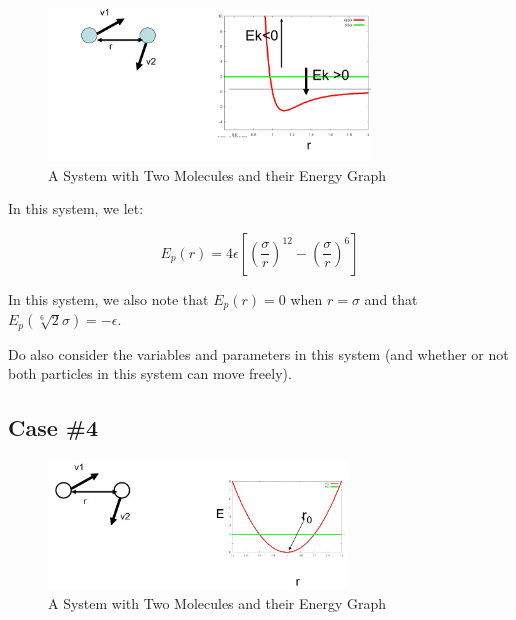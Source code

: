 \documentclass[
  letterpaper,
  DIV=11,
  numbers=noendperiod]{scrreprt}
\begin{document}
\begin{figure}

{\centering \includegraphics[width=3.36in,height=\textheight]{./images/wk1/sys3.jpg}

}

\caption{A System with Two Molecules and their Energy Graph}

\end{figure}

In this system, we let:

\begin{equation}
  E_p(r) = 4\epsilon\left[\left(\frac{\sigma}{r}\right)^{12} - \left(\frac{\sigma}{r}\right)^6\right]
\end{equation}

In this system, we also note that \(E_p(r) = 0\) when \(r = \sigma\) and
that \(\displaystyle E_p(\sqrt[6]{2}\sigma) = -\epsilon\).

Do also consider the variables and parameters in this system (and
whether or not both particles in this system can move freely).

\hypertarget{case-4-1}{%
\subsection{Case \#4}\label{case-4-1}}

\begin{figure}

{\centering \includegraphics[width=3.13in,height=\textheight]{./images/wk1/sys4.jpg}

}

\caption{A System with Two Molecules and their Energy Graph}

\end{figure}
\end{document}
